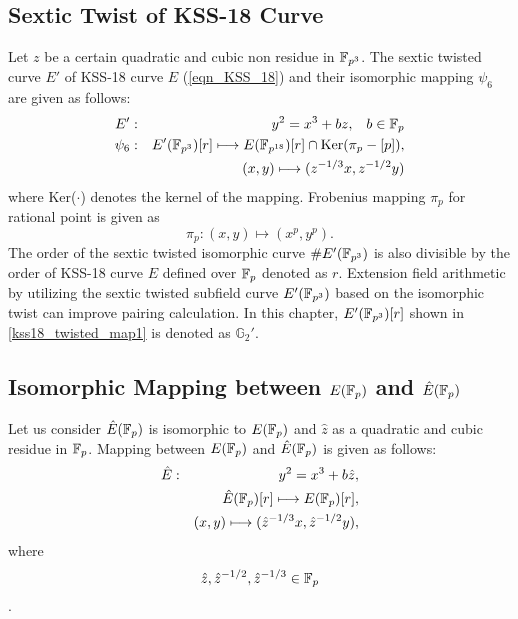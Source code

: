 \subsection{Sextic Twist of KSS-18 Curve }
\label{sec:ch:icisc:sextictwist_KSS18}
Let $z$ be a certain quadratic and cubic non residue in  $\mathbb{F}_{p^{3}}$. 
The sextic twisted curve $E'$ of KSS-18 curve $E$ (\eqref{eqn_KSS_18}) and  their isomorphic mapping $\psi_6$ are given as follows:
\begin{eqnarray}
	E'&:&y^2=x^3+bz,\;\;\;b\in{\mathbb{F}}_{p}\nonumber\\
	\psi_6&:&E'(\mathbb{F}_{p^{3}})[r] \longmapsto E(\mathbb{F}_{p^{18}})[r]\cap {\rm Ker}(\pi_p-[p]),\nonumber\\
	&&(x,y)\longmapsto (z^{-1/3}x,z^{-1/2}y)\label{kss18_twisted_map1}
\end{eqnarray}
where Ker($\cdot$) denotes the kernel of the mapping. Frobenius mapping $\pi_p$ for rational point is given as
\begin{equation}
	\pi_p : (x,y) \longmapsto (x^p,y^p).
\end{equation}
The order of the sextic twisted isomorphic curve $\#E'(\mathbb{F}_{p^3})$  is also divisible by the order of KSS-18 curve $E$ defined over ${\mathbb{F}}_{p}$ denoted as $r$. Extension field arithmetic by utilizing the sextic twisted subfield curve $E'(\mathbb{F}_{p^{3}})$ based on the isomorphic twist can improve pairing calculation. In this chapter, $E'(\mathbb{F}_{p^{3}})[r]$ shown in \eqref{kss18_twisted_map1} is denoted as $\mathbb{G}_2'$.

\subsection{Isomorphic Mapping  between \texorpdfstring{$E({\mathbb{F}}_{p})$ and $\hat{E}({\mathbb{F}}_{p})$} {}} 
Let us consider $\hat{E}({\mathbb{F}}_{p})$  is isomorphic to $E({\mathbb{F}}_{p})$ and $\hat{z}$ as a quadratic and cubic residue in ${\mathbb{F}}_{p}$. Mapping between $E({\mathbb{F}}_{p})$ and $\hat{E}({\mathbb{F}}_{p})$ is given as follows:
\begin{eqnarray}
	\hat{E}&:&y^2=x^3+b\hat{z},\nonumber\\
	&&\hat{E}({\mathbb{F}}_{p})[r]\longmapsto E({\mathbb{F}}_{p})[r],\nonumber\\
	&&(x,y)\longmapsto (\hat{z}^{-1/3}x,\hat{z}^{-1/2}y),\nonumber
\end{eqnarray}
where $$\hat{z}, \hat{z}^{-1/2},\hat{z}^{-1/3} \in {\mathbb{F}}_{p}$$ \label{isisc16_kss18_isomap}.
